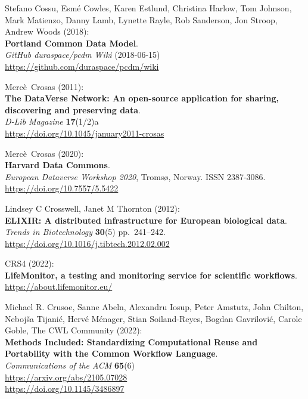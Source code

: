 \begin{thebibliography}{9}
Stefano Cossu, Esmé Cowles, Karen Estlund, Christina Harlow,
Tom Johnson, Mark Matienzo, Danny Lamb, Lynette Rayle, Rob Sanderson,
Jon Stroop, Andrew Woods (2018):\\
\textbf{Portland Common Data Model}.\\
\emph{GitHub duraspace/pcdm Wiki} (2018-06-15)\\
\url{https://github.com/duraspace/pcdm/wiki}

Mercè~Crosas (2011):\\
\textbf{The DataVerse Network: An open-source application for sharing,
discovering and preserving data}.\\
\emph{D-Lib Magazine} \textbf{17}(1/2)a\\
\url{https://doi.org/10.1045/january2011-crosas}

Mercè~Crosas (2020):\\
\textbf{Harvard Data Commons}.\\
\emph{European Dataverse Workshop 2020}, Tromsø, Norway. ISSN
2387-3086.\\
\url{https://doi.org/10.7557/5.5422}

Lindsey C Crosswell, Janet M Thornton (2012):\\
\textbf{ELIXIR: A distributed infrastructure for European biological
data}.\\
\emph{Trends in Biotechnology} \textbf{30}(5) pp.~241--242.\\
\url{https://doi.org/10.1016/j.tibtech.2012.02.002}

CRS4 (2022):\\
\textbf{LifeMonitor, a testing and monitoring service for scientific
workflows}.\\
\url{https://about.lifemonitor.eu/}

Michael R. Crusoe, Sanne Abeln, Alexandru Iosup, Peter
Amstutz, John Chilton, Nebojša Tijanić, Hervé Ménager, Stian
Soiland-Reyes, Bogdan Gavrilović, Carole Goble, The CWL Community
(2022):\\
\textbf{Methods Included: Standardizing
Computational Reuse and Portability with the Common Workflow
Language}.\\
\emph{Communications of the ACM} \textbf{65}(6)\\
\url{https://arxiv.org/abs/2105.07028}\\
\url{https://doi.org/10.1145/3486897}


\end{thebibliography}
